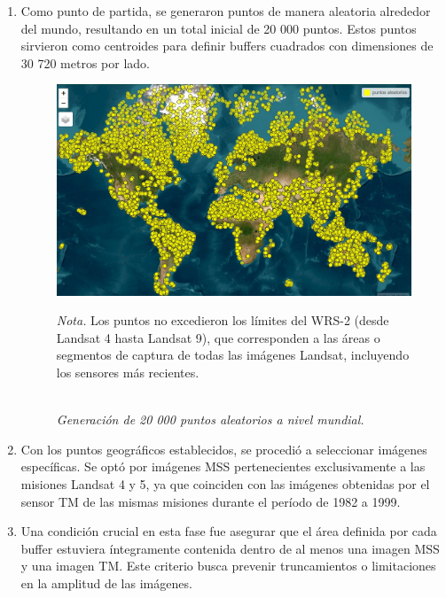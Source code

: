                 \begin{enumerate}
                    \item Como punto de partida, se generaron puntos de manera aleatoria alrededor del mundo, resultando en un total inicial de 20 000 puntos. Estos puntos sirvieron como centroides para definir buffers cuadrados con dimensiones de 30 720 metros por lado.
                    
                    \begin{figure}[H] 
                        \caption{\doublespacing \\ \textit{Generación de 20 000 puntos aleatorios a nivel mundial.}} 
                        \centering
                        \includegraphics[width=0.9\linewidth]{2_CAPITULO0/IMG/1000points.png}
                        \begin{justify}
                            \textit{Nota.} Los puntos no excedieron los límites del WRS-2 (desde Landsat 4 hasta Landsat 9), que corresponden a las áreas o segmentos de captura de todas las imágenes Landsat, incluyendo los sensores más recientes.
                        \end{justify}                    
                        \label{1000points}
                    \end{figure}

        
                    \item Con los puntos geográficos establecidos, se procedió a seleccionar imágenes específicas. Se optó por imágenes MSS pertenecientes exclusivamente a las misiones Landsat 4 y 5, ya que coinciden con las imágenes obtenidas por el sensor TM de las mismas misiones durante el período de 1982 a 1999.
                
                    \item Una condición crucial en esta fase fue asegurar que el área definida por cada buffer estuviera íntegramente contenida dentro de al menos una imagen MSS y una imagen TM. Este criterio busca prevenir truncamientos o limitaciones en la amplitud de las imágenes.
                    

\end{enumerate}
